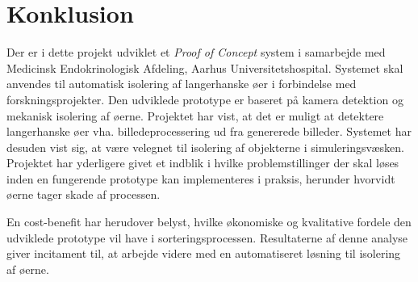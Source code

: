 \chapter{Konklusion}
Der er i dette projekt udviklet et \textit{Proof of Concept} system i samarbejde med Medicinsk Endokrinologisk Afdeling, Aarhus Universitetshospital. Systemet skal anvendes til automatisk isolering af langerhanske øer i forbindelse med forskningsprojekter. Den udviklede prototype er baseret på kamera detektion og mekanisk isolering af øerne. Projektet har vist, at det er muligt at detektere langerhanske øer vha. billedeprocessering ud fra genererede billeder. Systemet har desuden vist sig, at være velegnet til isolering af objekterne i simuleringsvæsken. Projektet har yderligere givet et indblik i hvilke problemstillinger der skal løses inden en fungerende prototype kan implementeres i praksis, herunder hvorvidt øerne tager skade af processen. 

En cost-benefit har herudover belyst, hvilke økonomiske og kvalitative fordele den udviklede prototype vil have i sorteringsprocessen. Resultaterne af denne analyse giver incitament til, at arbejde videre med en automatiseret løsning til isolering af øerne. 

